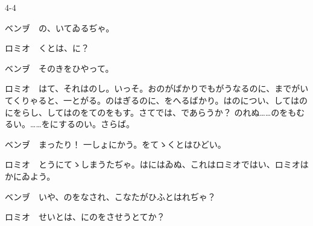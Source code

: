 \documentclass[tate,paper=b6j,jafontsize=9pt]{jlreq}
\begin{document}
\begin{azconvIndented}{4\zw}{-4\zw}

ベンヺ　の、いてゐるぢゃ。

ロミオ　くとは、に？

ベンヺ　そのきをひやって。

ロミオ　はて、それはのし。いっそ。おのがばかりでもがうなるのに、までがいてくりゃると、一とがる。のはぎるのに、をへるばかり。はのについ、してはのにをらし、してはのをてのをもす。さてでは、であらうか？ のれぬ……のをもむるい。……をにするのい。さらば。

ベンヺ　まったり！ 一しょにかう。をてゝくとはひどい。

ロミオ　とうにてゝしまうたぢゃ。はにはゐぬ、これはロミオではい、ロミオはかにゐよう。

ベンヺ　いや、のをなされ、こなたがひふとはれぢゃ？

ロミオ　せいとは、にのをさせうとてか？


\end{azconvIndented}
\end{document}
